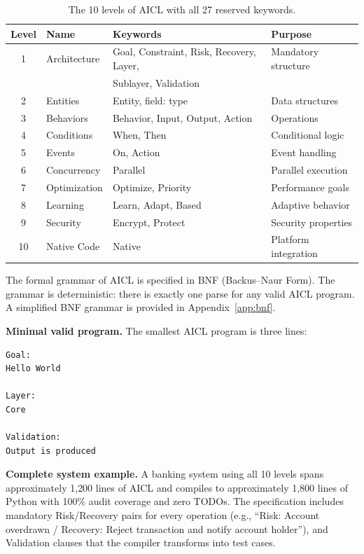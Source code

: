 \documentclass[11pt]{article}
\newcommand{\aicl}{\textsc{AICL}}
\begin{document}
\begin{table}[htbp]
\centering
\caption{The 10 levels of \aicl{} with all 27 reserved keywords.}
\label{tab:aicl-levels}
\begin{tabular}{@{}clll@{}}
\toprule
\textbf{Level} & \textbf{Name} & \textbf{Keywords} & \textbf{Purpose} \\
\midrule
1  & Architecture & Goal, Constraint, Risk, Recovery, Layer, & Mandatory structure \\
   &              & Sublayer, Validation                      &  \\
2  & Entities     & Entity, field: type                       & Data structures \\
3  & Behaviors    & Behavior, Input, Output, Action           & Operations \\
4  & Conditions   & When, Then                                & Conditional logic \\
5  & Events       & On, Action                                & Event handling \\
6  & Concurrency  & Parallel                                  & Parallel execution \\
7  & Optimization & Optimize, Priority                        & Performance goals \\
8  & Learning     & Learn, Adapt, Based                       & Adaptive behavior \\
9  & Security     & Encrypt, Protect                          & Security properties \\
10 & Native Code  & Native                                    & Platform integration \\
\bottomrule
\end{tabular}
\end{table}

The formal grammar of \aicl{} is specified in BNF (Backus--Naur Form). The grammar is deterministic: there is exactly one parse for any valid \aicl{} program. A simplified BNF grammar is provided in Appendix~\ref{app:bnf}.

\textbf{Minimal valid program.} The smallest \aicl{} program is three lines:
\begin{lstlisting}[language=AICL]
Goal:
Hello World

Layer:
Core

Validation:
Output is produced
\end{lstlisting}

\textbf{Complete system example.} A banking system using all 10 levels spans approximately 1{,}200 lines of \aicl{} and compiles to approximately 1{,}800 lines of Python with 100\% audit coverage and zero TODOs. The specification includes mandatory Risk/Recovery pairs for every operation (e.g., ``Risk: Account overdrawn / Recovery: Reject transaction and notify account holder''), and Validation clauses that the compiler transforms into test cases.
\end{document}
